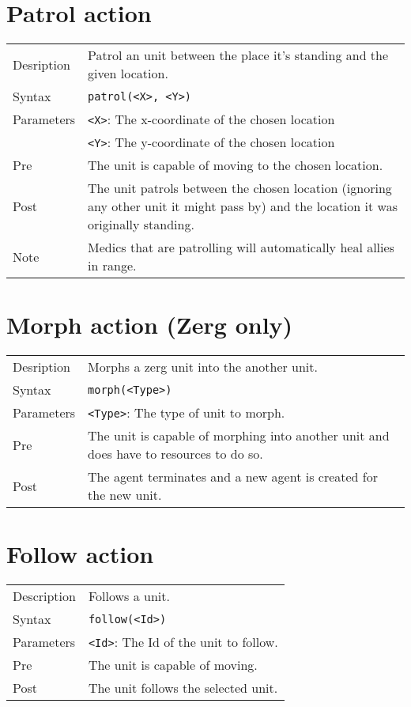 \section{Patrol action}
\begin{tabularx}{\textwidth}{lX}
 Desription & Patrol an unit between the place it's standing and the given location. \\
 Syntax & \verb|patrol(<X>, <Y>)| \\
 Parameters & \verb|<X>|: The x-coordinate of the chosen location \\
            &  \verb|<Y>|: The y-coordinate of the chosen location \\
 Pre & The unit is capable of moving to the chosen location. \\
 Post & The unit patrols between the chosen location (ignoring any other unit it might pass by) and the location it was originally standing.\\
 Note & Medics that are patrolling will automatically heal allies in range.
\end{tabularx}

\section{Morph action (Zerg only)}
\begin{tabularx}{\textwidth}{lX}
 Desription & Morphs a zerg unit into the another unit. \\
 Syntax & \verb|morph(<Type>)| \\
 Parameters & \verb|<Type>|: The type of unit to morph.\\
 Pre & The unit is capable of morphing into another unit and does have to resources to do so. \\
 Post & The agent terminates and a new agent is created for the new unit.
\end{tabularx}

\section{Follow action}
\begin{tabularx}{\textwidth}{lX}
 Description & Follows a unit. \\
 Syntax & \verb|follow(<Id>)| \\
 Parameters & \verb|<Id>|: The Id of the unit to follow. \\
 Pre & The unit is capable of moving. \\
 Post & The unit follows the selected unit.
\end{tabularx}

